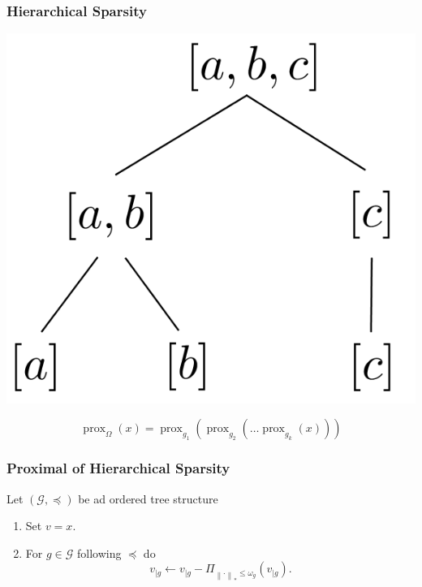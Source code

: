 \documentclass[aspectratio=169]{beamer}
\DeclareMathOperator{\Prox}{prox}
\newcommand{\prox}[2]{\Prox_{#1}\left({#2}\right)}
\newcommand{\norm}[1]{\left\|#1\right\|}
\begin{document}
		\begin{frame}
		\frametitle{Hierarchical Sparsity}
		\begin{center}
		\includegraphics[width=.3\textwidth]{img/treestructuretransparent.png}
		
		\begin{equation}
		\nonumber \prox{\Omega}{x} = \prox{g_1}{\prox{g_2}{\dots\prox{g_k}{x}}}
		\end{equation}
		\end{center}
		\end{frame}
		
		\begin{frame}
		\frametitle{Proximal of Hierarchical Sparsity}
		Let $(\mathcal{G}, \preceq)$ be ad ordered tree structure
		\begin{enumerate}
		\item Set $v = x$.
		\item For $g\in\mathcal{G}$ following $\preceq$ do
		\begin{equation}
		\nonumber
		v_{|g} \longleftarrow v_{|g} - \Pi_{\norm{\cdot}_*\le\omega_g}\left(v_{|g}\right).
		\end{equation}
		\end{enumerate}
		\end{frame}
		
\end{document}
